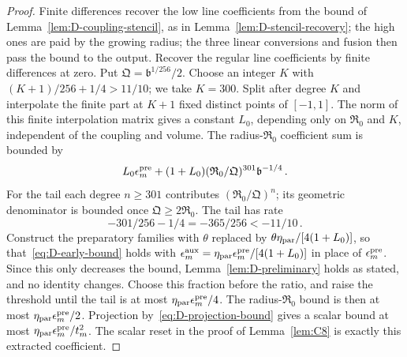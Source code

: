 \begin{proof}
Finite differences recover the low line coefficients from the bound of Lemma~\ref{lem:D-coupling-stencil}, as in Lemma~\ref{lem:D-stencil-recovery}; the high ones are paid by the growing radius; the three linear conversions and fusion then pass the bound to the output. Recover the regular line coefficients by finite differences at zero. Put $\mathfrak Q=\mathfrak b^{1/256}/2$. Choose an integer $K$ with $(K+1)/256+1/4>11/10$; we take $K=300$. Split after degree $K$ and interpolate the finite part at $K+1$ fixed distinct points of $[-1,1]$. The norm of this finite interpolation matrix gives a constant $L_0$, depending only on $\mathfrak R_0$ and $K$, independent of the coupling and volume. The radius-$\mathfrak R_0$ coefficient sum is bounded by
\begin{equation*}
L_0 \epsilon^{\rm pre}_m+(1+L_0)(\mathfrak R_0/\mathfrak Q)^{301}\mathfrak b^{-1/4}\,.
\end{equation*}
For the tail each degree $n\ge301$ contributes $(\mathfrak R_0/\mathfrak Q)^n$; its geometric denominator is bounded once $\mathfrak Q\ge2\mathfrak R_0$. The tail has rate
\begin{equation*}
-301/256-1/4=-365/256<-11/10\,.
\end{equation*}
Construct the preparatory families with $\theta$ replaced by $\theta\eta_{\rm par}/[4(1+L_0)]$, so that~\eqref{eq:D-early-bound} holds with $\epsilon^{\rm aux}_m=\eta_{\rm par}\epsilon^{\rm pre}_m/[4(1+L_0)]$ in place of $\epsilon^{\rm pre}_m$. Since this only decreases the bound, Lemma~\ref{lem:D-preliminary} holds as stated, and no identity changes. Choose this fraction before the ratio, and raise the threshold until the tail is at most $\eta_{\rm par}\epsilon^{\rm pre}_m/4$. The radius-$\mathfrak R_0$ bound is then at most $\eta_{\rm par}\epsilon^{\rm pre}_m/2$. Projection by~\eqref{eq:D-projection-bound} gives a scalar bound at most $\eta_{\rm par}\epsilon^{\rm pre}_m/t_m^2$. The scalar reset in the proof of Lemma~\ref{lem:C8} is exactly this extracted coefficient.


\end{proof}
